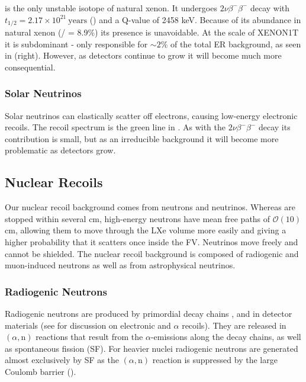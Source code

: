 {\subsubsection{}
\label{subsubsec:backgrounds_electronic_xe}
 is the only unstable isotope of natural xenon.  It undergoes $2 \nu \beta^- \beta^-$ decay with
$t_{1/2} = 2.17 \times 10^{21}\ \mathrm{years}$ () and a Q-value of 2458 keV.  Because of its abundance in natural
xenon (/ = 8.9\%) its presence is unavoidable.  At the scale of XENON1T it is subdominant - only responsible for
${\sim}2 \%$ of the total ER background, as seen in  (right).  However, as detectors continue to grow
it will become much more consequential.



\subsubsection{Solar Neutrinos}
\label{subsubsec:backgrounds_electronic_solar_neutrinos}
Solar neutrinos can elastically scatter off electrons, causing low-energy electronic recoils.  The recoil spectrum is the green line in
.  As with the  $2 \nu \beta^- \beta^-$
decay its contribution is small, but as an irreducible background it will become more problematic as detectors grow.



\subsection{Nuclear Recoils}
\label{subsec:backgrounds_nuclear}
Our nuclear recoil background comes from neutrons and neutrinos.  Whereas \gammarays are stopped within several cm, high-energy neutrons
have mean free paths of $\mathcal{O}(10)$ cm, allowing them to move through the LXe volume more easily and giving a higher probability
that it scatters once inside the FV.  Neutrinos move freely and cannot be shielded.  The nuclear recoil background is composed of
radiogenic and muon-induced neutrons as well as from astrophysical neutrinos.



\subsubsection{Radiogenic Neutrons}
\label{subsubsec:backgrounds_nuclear_radiogenic}
Radiogenic neutrons are produced by primordial decay chains ,  and  in detector materials
(see  for discussion on electronic and $\alpha$ recoils).  They are released in
$(\alpha, \mathrm{n})$ reactions that result from the $\alpha$-emissions along the decay chains, as well as spontaneous fission (SF).  For
heavier nuclei radiogenic neutrons are generated almost exclusively by SF as the $(\alpha, \mathrm{n})$ reaction is suppressed by the
large Coulomb barrier ().

}
